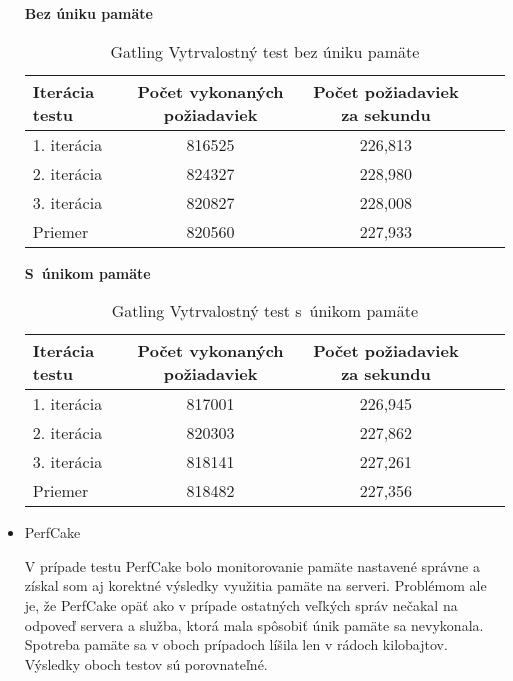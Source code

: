 \documentclass[12pt,oneside,final]{fithesis-utf8}
\begin{document}
\begin{itemize}
\textbf{Bez úniku pamäte}

\begin{table}[H]
\begin{center}
\begin{tabular}{ | l | c | c | c | c |}
		\hline
		 \textbf{Iterácia testu} & \textbf{Počet vykonaných požiadaviek} & \textbf{Počet požiadaviek za sekundu} \\ \hline
		 1. iterácia & 816525 & 226,813 \\ \hline
		 2. iterácia & 824327 & 228,980 \\ \hline
		 3. iterácia & 820827 & 228,008 \\ \hline
		 Priemer & 820560 & 227,933 \\ \hline
		 
\end{tabular}
\end{center}
\caption{Gatling Vytrvalostný test bez úniku pamäte}
\end{table}

\textbf{S~únikom pamäte}

\begin{table}[H]
\begin{center}
\begin{tabular}{ | l | c | c | c | c |}
		\hline
		 \textbf{Iterácia testu} & \textbf{Počet vykonaných požiadaviek} & \textbf{Počet požiadaviek za sekundu} \\ \hline
		 1. iterácia & 817001 & 226,945 \\ \hline
		 2. iterácia & 820303 & 227,862 \\ \hline
		 3. iterácia & 818141 & 227,261 \\ \hline
		 Priemer & 818482 & 227,356 \\ \hline
		 
\end{tabular}
\end{center}
\caption{Gatling Vytrvalostný test s~únikom pamäte}
\end{table}

\item PerfCake

V prípade testu PerfCake bolo monitorovanie pamäte nastavené správne a získal som aj korektné výsledky využitia pamäte na serveri. Problémom ale je, že PerfCake opäť ako v prípade ostatných veľkých správ nečakal na odpoveď servera a služba, ktorá mala spôsobiť únik pamäte sa nevykonala. Spotreba pamäte sa v oboch prípadoch líšila len v rádoch kilobajtov. Výsledky oboch testov sú porovnateľné.




\end{itemize}
\end{document}
